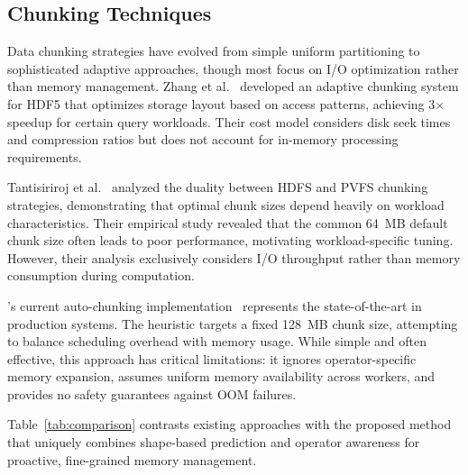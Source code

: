 \subsection{Chunking Techniques}

Data chunking strategies have evolved from simple uniform partitioning to sophisticated adaptive approaches, though most focus on \ac{I/O} optimization rather than memory management.
Zhang et al.~\cite{zhang2019} developed an adaptive chunking system for \ac{HDF5} that optimizes storage layout based on access patterns, achieving 3× speedup for certain query workloads.
Their cost model considers disk seek times and compression ratios but does not account for in-memory processing requirements.

Tantisiriroj et al.~\cite{tantisiriroj2011} analyzed the duality between \ac{HDFS} and \ac{PVFS} chunking strategies, demonstrating that optimal chunk sizes depend heavily on workload characteristics.
Their empirical study revealed that the common 64~MB default chunk size often leads to poor performance, motivating workload-specific tuning.
However, their analysis exclusively considers \ac{I/O} throughput rather than memory consumption during computation.

\dask's current auto-chunking implementation~\cite{rocklin2015dask} represents the state-of-the-art in production systems.
The heuristic targets a fixed 128~MB chunk size, attempting to balance scheduling overhead with memory usage.
While simple and often effective, this approach has critical limitations: it ignores operator-specific memory expansion, assumes uniform memory availability across workers, and provides no safety guarantees against \ac{OOM} failures.

Table~\ref{tab:comparison} contrasts existing approaches with the proposed method that uniquely combines shape-based prediction and operator awareness for proactive, fine-grained memory management.

